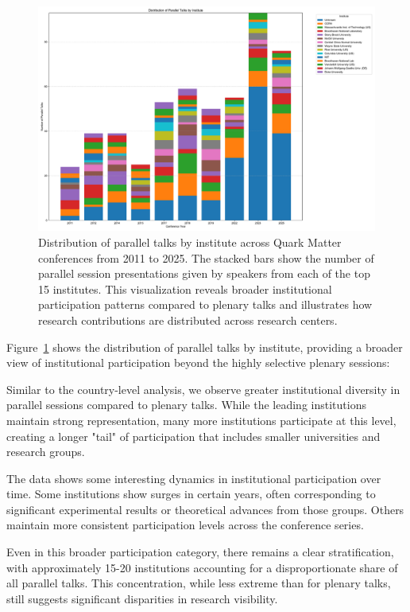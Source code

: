 \documentclass[a4paper,11pt]{article}
\begin{document}
\begin{figure}[H]
\centering
\includegraphics[width=\textwidth]{figures/parallel_talks_by_institute.pdf}
\caption{Distribution of parallel talks by institute across Quark Matter conferences from 2011 to 2025. The stacked bars show the number of parallel session presentations given by speakers from each of the top 15 institutes. This visualization reveals broader institutional participation patterns compared to plenary talks and illustrates how research contributions are distributed across research centers.}
\label{fig:institute_parallel}
\end{figure}

Figure~\ref{fig:institute_parallel} shows the distribution of parallel talks by institute, providing a broader view of institutional participation beyond the highly selective plenary sessions:

Similar to the country-level analysis, we observe greater institutional diversity in parallel sessions compared to plenary talks. While the leading institutions maintain strong representation, many more institutions participate at this level, creating a longer "tail" of participation that includes smaller universities and research groups.

The data shows some interesting dynamics in institutional participation over time. Some institutions show surges in certain years, often corresponding to significant experimental results or theoretical advances from those groups. Others maintain more consistent participation levels across the conference series.

Even in this broader participation category, there remains a clear stratification, with approximately 15-20 institutions accounting for a disproportionate share of all parallel talks. This concentration, while less extreme than for plenary talks, still suggests significant disparities in research visibility.
\end{document}
